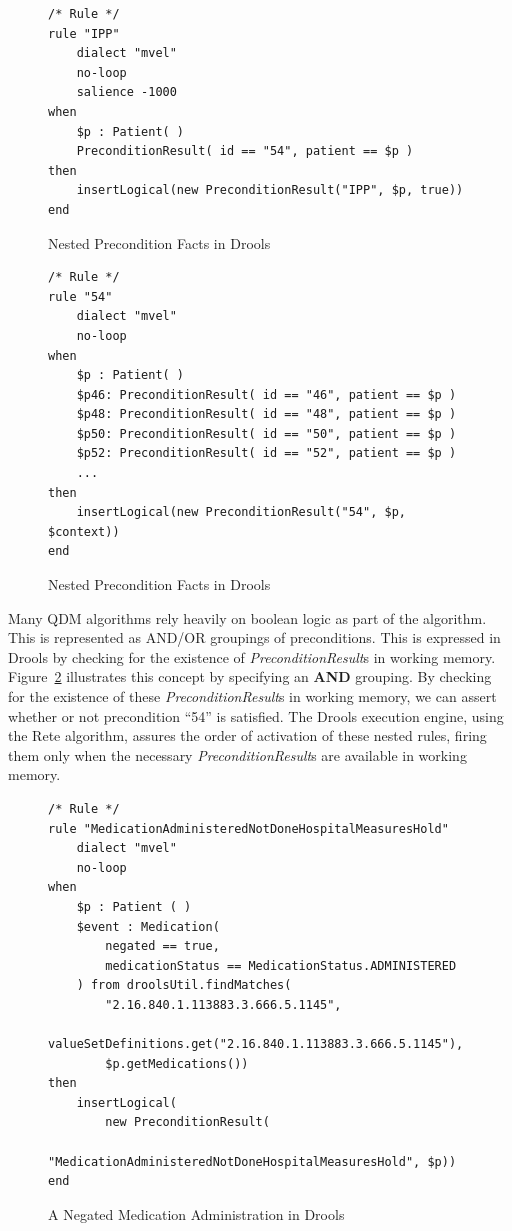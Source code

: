 \documentclass{amia}
\begin{document}
\begin{figure}[H]
\begin{verbatim}
/* Rule */
rule "IPP"
    dialect "mvel"
    no-loop
    salience -1000
when
    $p : Patient( )
    PreconditionResult( id == "54", patient == $p )
then
    insertLogical(new PreconditionResult("IPP", $p, true))
end
\end{verbatim}
\caption{Nested Precondition Facts in Drools} 
\label{fig:drools_population}
\end{figure}


\begin{figure}[H]
\begin{verbatim}
/* Rule */
rule "54"
    dialect "mvel"
    no-loop
when
    $p : Patient( )
    $p46: PreconditionResult( id == "46", patient == $p )
    $p48: PreconditionResult( id == "48", patient == $p )
    $p50: PreconditionResult( id == "50", patient == $p )
    $p52: PreconditionResult( id == "52", patient == $p )
    ...
then
    insertLogical(new PreconditionResult("54", $p, $context))
end
\end{verbatim}
\caption{Nested Precondition Facts in Drools} 
\label{fig:drools_precondition_groupings}
\end{figure}

Many QDM algorithms rely heavily on boolean logic as part of the algorithm. This is represented as AND/OR groupings of preconditions. This is expressed in Drools by checking for the existence of \textit{PreconditionResult}s in working memory. Figure~\ref{fig:drools_precondition_groupings} illustrates this concept by specifying an \textbf{AND} grouping. By checking for the existence of these \textit{PreconditionResult}s in working memory, we can assert whether or not precondition ``54'' is satisfied. The Drools execution engine, using the Rete algorithm, assures the order of activation of these nested rules, firing them only when the necessary \textit{PreconditionResult}s are available in working memory\cite{forgy1982rete}.


\begin{figure}[H]
\begin{verbatim}
/* Rule */
rule "MedicationAdministeredNotDoneHospitalMeasuresHold"
    dialect "mvel"
    no-loop
when
    $p : Patient ( )
    $event : Medication(
        negated == true,
        medicationStatus == MedicationStatus.ADMINISTERED
    ) from droolsUtil.findMatches(
        "2.16.840.1.113883.3.666.5.1145", 
        valueSetDefinitions.get("2.16.840.1.113883.3.666.5.1145"), 
        $p.getMedications())
then
    insertLogical(
        new PreconditionResult(
            "MedicationAdministeredNotDoneHospitalMeasuresHold", $p))
end
\end{verbatim}
\caption{A Negated Medication Administration in Drools} 
\label{fig:drools_data_element}
\end{figure}
\end{document}
